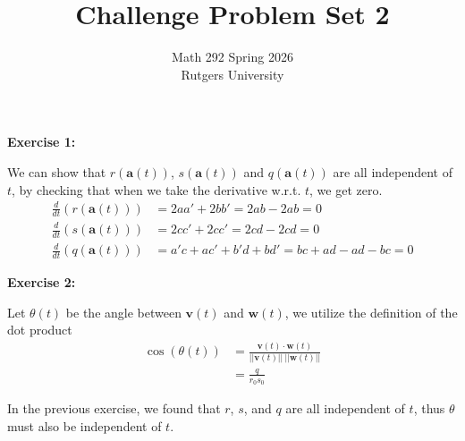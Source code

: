 \documentclass[12pt]{article}
\title{Challenge Problem Set 2}
\author{Math 292 Spring 2026 \\ Rutgers University}
\date{}
\begin{document}
\maketitle

\noindent{}\textbf{Exercise 1:}

We can show that $r(\mathbf{a}(t))$, $s(\mathbf{a}(t))$ and $q(\mathbf{a}(t))$ are all independent of $t$,
by checking that when we take the derivative w.r.t. $t$, we get zero.
\begin{align}
    \frac{d}{dt}(r(\mathbf{a}(t))) & = 2aa' + 2bb' = 2ab-2ab = 0                    \\
    \frac{d}{dt}(s(\mathbf{a}(t))) & = 2cc' + 2cc' = 2cd-2cd = 0                    \\
    \frac{d}{dt}(q(\mathbf{a}(t))) & = a'c + ac' + b'd + bd' = bc + ad - ad -bc = 0
\end{align}

\noindent{}\textbf{Exercise 2:}

Let $\theta{}(t)$ be the angle between $\mathbf{v}(t)$ and $\mathbf{w}(t)$, we utilize the definition of the dot product
\begin{align*}
    \cos(\theta{}(t)) & = \frac{\mathbf{v}(t) \cdot{\mathbf{w}(t)}}{||\mathbf{v}(t)||~||\mathbf{w}(t)||} \\
                      & = \frac{q}{r_0s_0}
\end{align*}

In the previous exercise, we found that $r$, $s$, and $q$ are all independent of $t$,
thus $\theta$ must also be independent of $t$.
\end{document}
